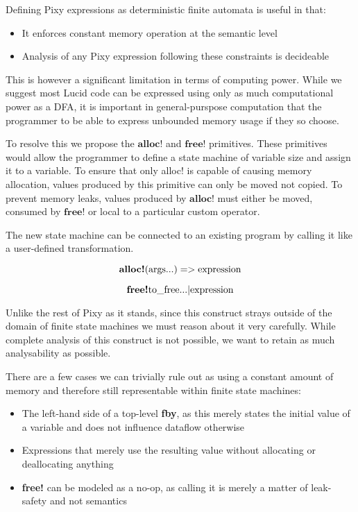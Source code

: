\documentclass{scrartcl}
\begin{document}
    Defining Pixy expressions as deterministic finite automata is useful in that:
    \begin{itemize}
        \item It enforces constant memory operation at the semantic level
        \item Analysis of any Pixy expression following these constraints is decideable
    \end{itemize}
    
    This is however a significant limitation in terms of computing power. While we suggest most Lucid code can be expressed using only as much computational power as a DFA, it is important in general-purspose computation that the programmer to be able to express unbounded memory usage if they so choose.
    
    To resolve this we propose the $\textbf{alloc!}$ and $\textbf{free!}$ primitives. These primitives would allow the programmer to define a state machine of variable size and assign it to a variable. To ensure that only alloc! is capable of causing memory allocation, values produced by this primitive can only be moved not copied. To prevent memory leaks, values produced by $\textbf{alloc!}$ must either be moved, consumed by $\textbf{free!}$ or local to a particular custom operator.
    
    The new state machine can be connected to an existing program by calling it like a user-defined transformation.
    
    \begin{equation}
    \textbf{alloc!} (\textnormal{args}...) => \textnormal{expression}
    \end{equation}
    
    \begin{equation}    
    \textbf{free!} \textnormal{to\_free}... | \textnormal{expression}
    \end{equation}
    
    Unlike the rest of Pixy as it stands, since this construct strays outside of the domain of finite state machines we must reason about it very carefully. While complete analysis of this construct is not possible, we want to retain as much analysability as possible.
    
    There are a few cases we can trivially rule out as using a constant amount of memory and therefore still representable within finite state machines:
    \begin{itemize}
        \item The left-hand side of a top-level \textbf{fby}, as this merely states the initial value of a variable and does not influence dataflow otherwise
        \item Expressions that merely use the resulting value without allocating or deallocating anything
        \item \textbf{free!} can be modeled as a no-op, as calling it is merely a matter of leak-safety and not semantics
    \end{itemize}
    
\end{document}
